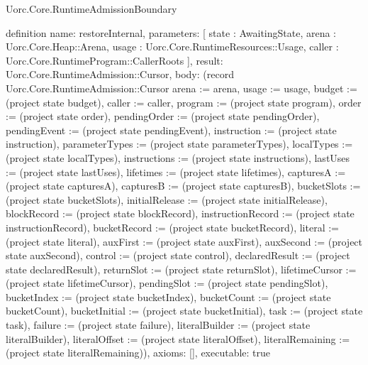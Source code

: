 \begin{lexlean}{Uorc.Core.RuntimeAdmissionBoundary}
\begin{semanticmodule}
definition{
  name: restoreInternal,
  parameters: [
    state : AwaitingState,
    arena : Uorc.Core.Heap::Arena,
    usage : Uorc.Core.RuntimeResources::Usage,
    caller : Uorc.Core.RuntimeProgram::CallerRoots
  ],
  result: Uorc.Core.RuntimeAdmission::Cursor,
  body: (record Uorc.Core.RuntimeAdmission::Cursor {arena := arena, usage := usage, budget := (project state budget), caller := caller, program := (project state program), order := (project state order), pendingOrder := (project state pendingOrder), pendingEvent := (project state pendingEvent), instruction := (project state instruction), parameterTypes := (project state parameterTypes), localTypes := (project state localTypes), instructions := (project state instructions), lastUses := (project state lastUses), lifetimes := (project state lifetimes), capturesA := (project state capturesA), capturesB := (project state capturesB), bucketSlots := (project state bucketSlots), initialRelease := (project state initialRelease), blockRecord := (project state blockRecord), instructionRecord := (project state instructionRecord), bucketRecord := (project state bucketRecord), literal := (project state literal), auxFirst := (project state auxFirst), auxSecond := (project state auxSecond), control := (project state control), declaredResult := (project state declaredResult), returnSlot := (project state returnSlot), lifetimeCursor := (project state lifetimeCursor), pendingSlot := (project state pendingSlot), bucketIndex := (project state bucketIndex), bucketCount := (project state bucketCount), bucketInitial := (project state bucketInitial), task := (project state task), failure := (project state failure), literalBuilder := (project state literalBuilder), literalOffset := (project state literalOffset), literalRemaining := (project state literalRemaining)}),
  axioms: [],
  executable: true
}


\end{semanticmodule}
\end{lexlean}
